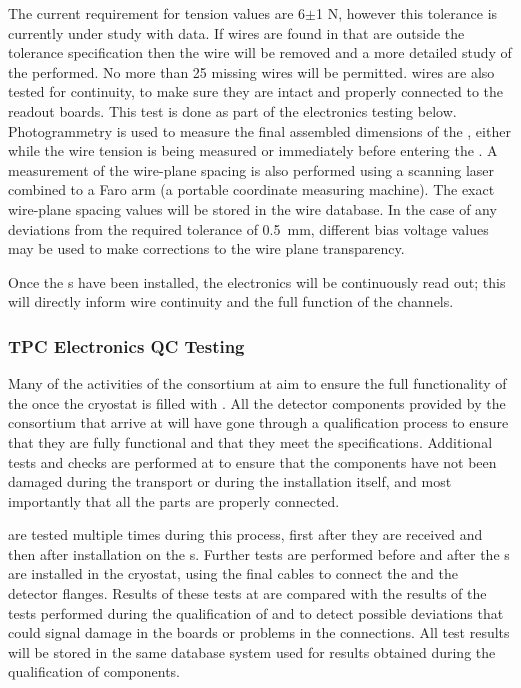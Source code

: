 The current requirement for tension values are 6$\pm$1 N, however this tolerance is currently under study with  data.  
If wires are found in  that are outside the tolerance specification then the wire will be removed and a more detailed study of the  performed. 
No more than 25 missing wires will be permitted. 
 wires are also tested for continuity, to make sure they are intact and properly connected to the readout boards.
This test is done as part of the  electronics testing below. 
Photogrammetry is used to measure the final assembled dimensions of the , either while the wire tension is being measured or immediately before entering the \coldbox. A measurement of the wire-plane spacing is also performed using a scanning laser combined to a Faro arm (a portable coordinate measuring machine). The exact wire-plane spacing values will be stored in the wire  database.  In the case of  
any deviations from the required tolerance of \SI{0.5}{mm}, different bias voltage values may be used to make corrections to the wire plane transparency. 

Once the s have been installed, the  electronics will be continuously read out;  this will directly inform wire continuity and the full function of the channels. 

\subsubsection{TPC Electronics QC Testing}

Many of the activities of the  consortium at  aim to ensure the full functionality of the  once the cryostat is filled with . 
All the detector components provided by the  consortium that arrive at  will have gone through a qualification process to ensure that they are fully functional and that they meet the  specifications. 
Additional tests and checks are performed at 
to ensure that the components have not
been damaged during the transport or during the installation itself,
and most importantly that all the parts are properly connected.

 are tested multiple times during this process,  
first after they are received and then 
after 
installation on the s. Further 
tests are performed before and after the 
s are installed in the cryostat, using the final cables to connect the  and the detector flanges. 
Results of these tests at  are compared with the results of the
tests performed during the qualification of  and
 to detect possible deviations that could signal 
damage in the boards or problems in the connections. All test 
results will be stored in the same database system used for
results obtained during the qualification of components.

